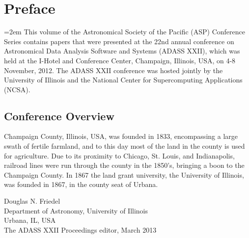 \pagestyle{myheadings}
\thispagestyle{plain}
\section*{\Large\bfseries Preface}
\bigskip
\parindent=2em
\setcounter{section}{1}
\noindent 
This volume of the Astronomical Society of the Pacific (ASP) Conference Series contains papers that were presented at the 22nd annual conference on Astronomical Data Analysis Software and Systems (ADASS XXII), which was held at the I-Hotel and Conference Center, Champaign, Illinois, USA, on 4-8 November, 2012. The ADASS XXII conference was hosted jointly by the University of Illinois and the National Center for Supercomputing Applications (NCSA).

\subsection{Conference Overview}
Champaign County, Illinois, USA, was founded in 1833, encompassing a large swath of fertile farmland, and to this day most of the land in the county is used for agriculture. Due to its proximity to Chicago, St. Louis, and Indianapolis, railroad lines were run through the county in the 1850's, bringing a boon to the Champaign County. In 1867 the land grant university, the University of Illinois, was founded in 1867, in the county seat of Urbana.  

\bigskip

\noindent Douglas N. Friedel\\
Department of Astronomy, University of Illinois\\
Urbana, IL, USA\\
The ADASS XXII Proceedings editor, March 2013
\vfill\eject
\thispagestyle{empty}
